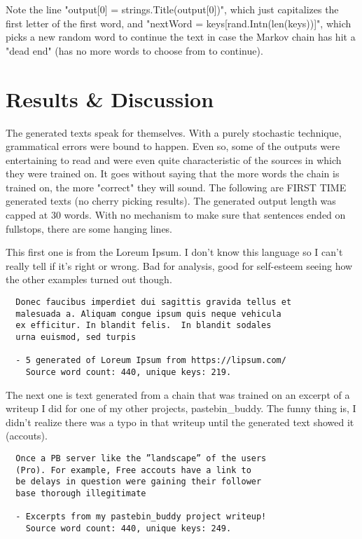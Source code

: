\documentclass[11pt, a4paper]{article}
\begin{document}
  Note the line "output[0] = strings.Title(output[0])", which just capitalizes the first letter of the first word, and "nextWord = keys[rand.Intn(len(keys))]", which picks a new random word to continue the text in case the Markov chain has hit a "dead end" (has no more words to choose from to continue).

  \section{Results \& Discussion}
  The generated texts speak for themselves. With a purely stochastic technique, grammatical errors were bound to happen. Even so, some of the outputs were entertaining to read and were even quite characteristic of the sources in which they were trained on. It goes without saying that the more words the chain is trained on, the more "correct" they will sound. The following are FIRST TIME generated texts (no cherry picking results). The generated output length was capped at 30 words. With no mechanism to make sure that sentences ended on fullstops, there are some hanging lines. \newline

  This first one is from the Loreum Ipsum. I don't know this language so I can't really tell if it's right or wrong. Bad for analysis, good for self-esteem seeing how the other examples turned out though. \newline

  \begin{lstlisting}
  Donec faucibus imperdiet dui sagittis gravida tellus et
  malesuada a. Aliquam congue ipsum quis neque vehicula
  ex efficitur. In blandit felis.  In blandit sodales
  urna euismod, sed turpis

  - 5 generated of Loreum Ipsum from https://lipsum.com/
    Source word count: 440, unique keys: 219.
  \end{lstlisting}

  The next one is text generated from a chain that was trained on an excerpt of a writeup I did for one of my other projects, pastebin\_buddy. The funny thing is, I didn't realize there was a typo in that writeup until the generated text showed it (accouts). \newline

  \begin{lstlisting}
  Once a PB server like the ”landscape” of the users
  (Pro). For example, Free accouts have a link to
  be delays in question were gaining their follower
  base thorough illegitimate

  - Excerpts from my pastebin_buddy project writeup!
    Source word count: 440, unique keys: 249.
  \end{lstlisting}
\end{document}
